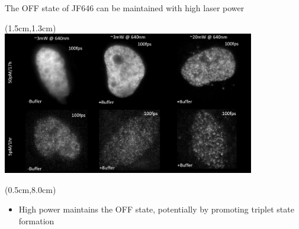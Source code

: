 \documentclass{beamer}					%
\begin{document}
\begin{frame}{The OFF state of JF646 can be maintained with high laser power}
\begin{textblock*}{11cm}(1.5cm,1.3cm)
\includegraphics[width=11cm]{Laser.png}
\end{textblock*}
\begin{textblock*}{\textwidth}(0.5cm,8.0cm)
\begin{itemize}
\item High power maintains the OFF state, potentially by promoting triplet state formation
\end{itemize}
\end{textblock*}
\end{frame}
\end{document}

